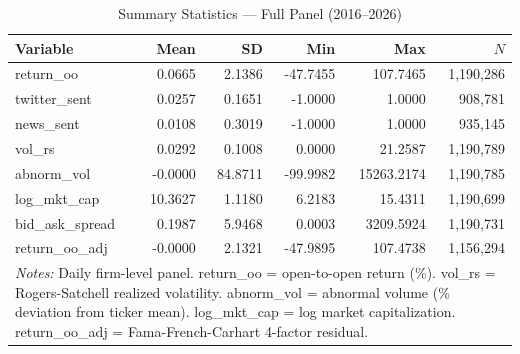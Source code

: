 \begin{table}[htbp]
\centering
\caption{Summary Statistics --- Full Panel (2016--2026)}
\label{tab:sumstats}
\begin{tabular}{lrrrrr}
\hline\hline
Variable & Mean & SD & Min & Max & $N$ \\
\hline
  return\_oo & 0.0665 & 2.1386 & -47.7455 & 107.7465 & 1,190,286 \\
  twitter\_sent & 0.0257 & 0.1651 & -1.0000 & 1.0000 & 908,781 \\
  news\_sent & 0.0108 & 0.3019 & -1.0000 & 1.0000 & 935,145 \\
  vol\_rs & 0.0292 & 0.1008 & 0.0000 & 21.2587 & 1,190,789 \\
  abnorm\_vol & -0.0000 & 84.8711 & -99.9982 & 15263.2174 & 1,190,785 \\
  log\_mkt\_cap & 10.3627 & 1.1180 & 6.2183 & 15.4311 & 1,190,699 \\
  bid\_ask\_spread & 0.1987 & 5.9468 & 0.0003 & 3209.5924 & 1,190,731 \\
  return\_oo\_adj & -0.0000 & 2.1321 & -47.9895 & 107.4738 & 1,156,294 \\
\hline\hline
\multicolumn{6}{p{0.95\linewidth}}{\footnotesize \textit{Notes:} Daily firm-level panel. return\_oo = open-to-open return (\%). vol\_rs = Rogers-Satchell realized volatility. abnorm\_vol = abnormal volume (\% deviation from ticker mean). log\_mkt\_cap = log market capitalization. return\_oo\_adj = Fama-French-Carhart 4-factor residual.} \\
\end{tabular}
\end{table}